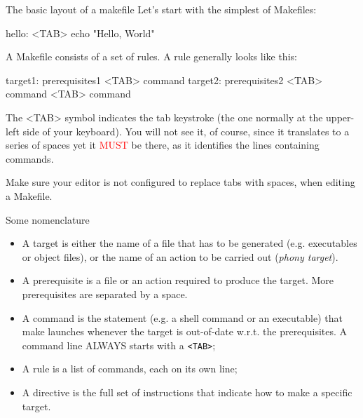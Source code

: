 \documentclass[10pt,aspectratio=169]{beamer}
\newcommand{\blue}{\color{blue}}
\begin{document}
\begin{frame}{The basic layout of a makefile}
Let's start with the simplest of Makefiles:
\begin{semiverbatim}
hello:\newline
\alert{<TAB>} echo "Hello, World"
\end{semiverbatim}

A Makefile consists of a set of rules. A rule generally looks like this:
\begin{semiverbatim}
\alert{target1}: {\blue prerequisites1}\newline
\alert{<TAB>} command\newline
\alert{target2}: {\blue prerequisites2}\newline
\alert{<TAB>} command\newline
\alert{<TAB>} command\newline
\end{semiverbatim}
\vspace*{-0.5cm}
The \alert{<TAB>} symbol indicates the \alert{tab keystroke} (the one
normally at the upper-left side of your keyboard). You will not see
it, of course, since it translates to a series of spaces
yet it \textcolor{red}{MUST} be there, as it identifies the lines containing {\blue commands}.
\smallskip

\alert{Make sure your editor is not configured to replace tabs with spaces, when editing a Makefile}.

\end{frame}

\begin{frame}{Some nomenclature}
\begin{itemize}
\item A \alert{target} is either the name of a file that has to be generated
  (e.g. executables or object files), or the name of an \alert{action} to be carried out (\emph{phony target}).
\item A \alert{prerequisite} is a file or an action required to
  produce the target. More prerequisites are separated by a space.
 \item A \alert{command} is the statement (e.g. a shell command or an executable)
 that make launches whenever the target is out-of-date w.r.t. the prerequisites. A
 command line ALWAYS starts with a \texttt{<TAB>};
\item A \alert{rule} is a list of commands, each on its own line;
\item A \alert{directive} is the full set of instructions that
  indicate how to make a specific target.
\end{itemize}
\end{frame}
\end{document}
